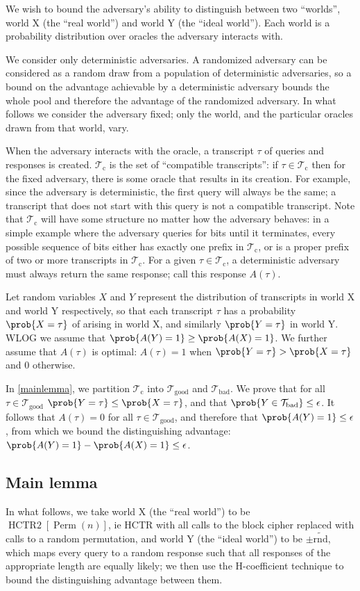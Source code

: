 \documentclass[letterpaper,11pt]{article}
\newcommand*{\Tb}{\mathcal{T}_\mathrm{bad}}
\newcommand*{\Tc}{\mathcal{T}_\mathrm{c}}
\newcommand*{\Tg}{\mathcal{T}_\mathrm{good}}
\DeclareMathOperator{\HCTR}{HCTR2}
\DeclareMathOperator{\Perm}{Perm}
\begin{document}
We wish to bound the adversary's ability to distinguish between
two ``worlds'', world X (the ``real world'') and world Y (the ``ideal world'').
Each world is a probability distribution over oracles the adversary
interacts with.

We consider only deterministic adversaries.
A randomized adversary can be considered as a random draw
from a population of deterministic adversaries, so
a bound on the advantage achievable by a deterministic
adversary bounds the whole pool and therefore
the advantage of the randomized adversary. In what follows
we consider the adversary fixed; only the world, and the
particular oracles drawn from that world, vary.

When the adversary interacts with the oracle,
a transcript \(\tau\) of queries and responses is created.
\(\Tc\) is the set of ``compatible transcripts'':
if \(\tau \in \Tc\) then for the fixed adversary,
there is some oracle
that results in its creation. For example,
since the adversary is deterministic, the first query
will always be the same; a transcript that
does not start with this query is not a compatible transcript.
Note that \(\Tc\) will have some structure
no matter how the adversary behaves:
in a simple example where the adversary
queries for bits until it terminates,
every possible sequence of bits 
either has exactly one prefix in \(\Tc\),
or is a proper prefix of two or more transcripts in \(\Tc\).
For a given \(\tau \in \Tc\),
a deterministic adversary must always
return the same response; call this response \(A(\tau)\).

Let random variables \(X\) and \(Y\)
represent the distribution of transcripts
in world X and world Y respectively, so that
each transcript \(\tau\) has a probability \(\prob{X = \tau}\)
of arising in world X, and similarly \(\prob{Y = \tau}\) in world Y.
WLOG we assume that \(\prob{A(Y) = 1} \geq \prob{A(X) = 1}\).
We further assume that \(A(\tau)\) is optimal:
\(A(\tau) = 1\)
when \(\prob{Y = \tau} > \prob{X = \tau}\) and 0 otherwise.

In \autoref{mainlemma}, we partition \(\Tc\) into \(\Tg\) and \(\Tb\). 
We prove that for all \(\tau \in \Tg\)
\(\prob{Y = \tau} \leq \prob{X = \tau}\),
and that \(\prob{Y \in \Tb} \leq \epsilon\).
It follows that \(A(\tau) = 0\) for all \(\tau \in \Tg\),
and therefore that \(\prob{A(Y) = 1} \leq \epsilon\),
from which we bound the distinguishing advantage:
\(\prob{A(Y) = 1} - \prob{A(X) = 1} \leq \epsilon\).

\subsection{Main lemma}\label{mainlemma}
In what follows, we take world X (the ``real world'') 
to be \(\HCTR[\Perm(n)]\),
ie HCTR with all calls to the block cipher
replaced with calls to a random permutation,
and world Y (the ``ideal world'') to be \(\pm\widetilde{\mathrm{rnd}}\),
which maps every query to a random response such that
all responses of the appropriate length are equally likely;
we then use the H-coefficient technique to bound
the distinguishing advantage between them.
\end{document}
